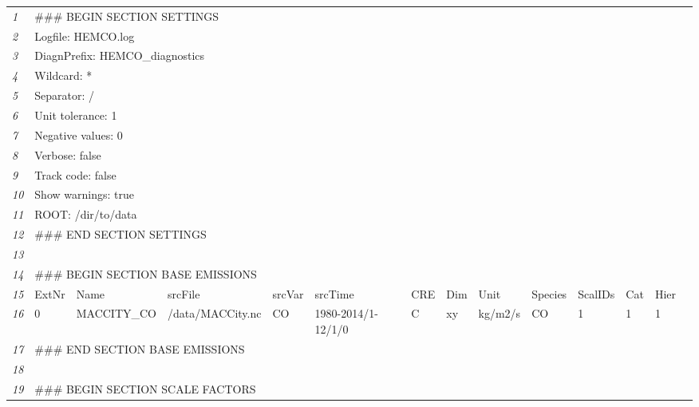 \documentclass[12pt,a4paper]{article} %
\begin{document}
\hspace*{-1cm}
\ifdefined\HCode
   \begin{small}
\else
   \begin{scriptsize}
\fi
   \begin{tabular}{l|lllllllllllll}\hline
    \textit{1} & \multicolumn{3}{l}{\#\#\# BEGIN SECTION SETTINGS} & & & & & & & & & & \\
    \textit{2} & \multicolumn{3}{l}{Logfile: HEMCO.log} & & & & & & & & & & \\
    \textit{3} & \multicolumn{3}{l}{DiagnPrefix: HEMCO\_diagnostics} & & & & & & & & & & \\
    \textit{4} & \multicolumn{3}{l}{Wildcard: *} & & & & & & & & & & \\
    \textit{5} & \multicolumn{3}{l}{Separator: /} & & & & & & & & & & \\
    \textit{6} & \multicolumn{3}{l}{Unit tolerance: 1} & & & & & & & & & & \\
    \textit{7} & \multicolumn{3}{l}{Negative values: 0} & & & & & & & & & & \\
    \textit{8} & \multicolumn{3}{l}{Verbose: false} & & & & & & & & & & \\
    \textit{9} & \multicolumn{3}{l}{Track code: false} & & & & & & & & & & \\
    \textit{10} & \multicolumn{3}{l}{Show warnings: true} & & & & & & & & & & \\
    \textit{11} & \multicolumn{3}{l}{ROOT: /dir/to/data} & & & & & & & & & & \\
    \textit{12} & \multicolumn{3}{l}{\#\#\# END SECTION SETTINGS} & & & & & & & & & & \\  
    \textit{13} & & & & & & & & & & & & & \\
    \textit{14} & \multicolumn{3}{l}{\#\#\# BEGIN SECTION BASE EMISSIONS} & & & & & & & & & & \\
    \textit{15} & ExtNr & Name & srcFile & srcVar & srcTime & CRE & Dim & Unit & Species & ScalIDs & Cat & Hier \\
    \textit{16} & 0 & MACCITY\_CO & /data/MACCity.nc & CO & 1980-2014/1-12/1/0 & C & xy & kg/m2/s & CO & 1 & 1 & 1 \\
    \textit{17} & \multicolumn{3}{l}{\#\#\# END SECTION BASE EMISSIONS} & & & & & & & & & & \\  
    \textit{18} & & & & & & & & & & & & &\\
    \textit{19} & \multicolumn{3}{l}{\#\#\# BEGIN SECTION SCALE FACTORS} & & & & & & & & & & \\ 

\end{tabular}
\end{scriptsize}
\end{small}
\end{document}
